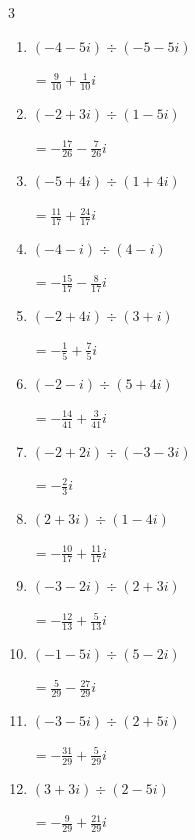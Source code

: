 \begin{multicols}{3}
\begin{enumerate}
        $\displaystyle =-\frac{14}{13}-\frac{5}{13}i$

  \item $\displaystyle (-4-5i)\div(-5-5i)$

        $\displaystyle =\frac{9}{10}+\frac{1}{10}i$

  \item $\displaystyle (-2+3i)\div(1-5i)$

        $\displaystyle =-\frac{17}{26}-\frac{7}{26}i$

\columnbreak %

  \item $\displaystyle (-5+4i)\div(1+4i)$

        $\displaystyle =\frac{11}{17}+\frac{24}{17}i$

  \item $\displaystyle (-4-i)\div(4-i)$

        $\displaystyle =-\frac{15}{17}-\frac{8}{17}i$

  \item $\displaystyle (-2+4i)\div(3+i)$

        $\displaystyle =-\frac{1}{5}+\frac{7}{5}i$

  \item $\displaystyle (-2-i)\div(5+4i)$

        $\displaystyle =-\frac{14}{41}+\frac{3}{41}i$

  \item $\displaystyle (-2+2i)\div(-3-3i)$

        $\displaystyle =-\frac{2}{3}i$

  \item $\displaystyle (2+3i)\div(1-4i)$

        $\displaystyle =-\frac{10}{17}+\frac{11}{17}i$

  \item $\displaystyle (-3-2i)\div(2+3i)$

        $\displaystyle =-\frac{12}{13}+\frac{5}{13}i$

  \item $\displaystyle (-1-5i)\div(5-2i)$

        $\displaystyle =\frac{5}{29}-\frac{27}{29}i$

  \item $\displaystyle (-3-5i)\div(2+5i)$

        $\displaystyle =-\frac{31}{29}+\frac{5}{29}i$

  \item $\displaystyle (3+3i)\div(2-5i)$

        $\displaystyle =-\frac{9}{29}+\frac{21}{29}i$

\end{enumerate}
\end{multicols}
